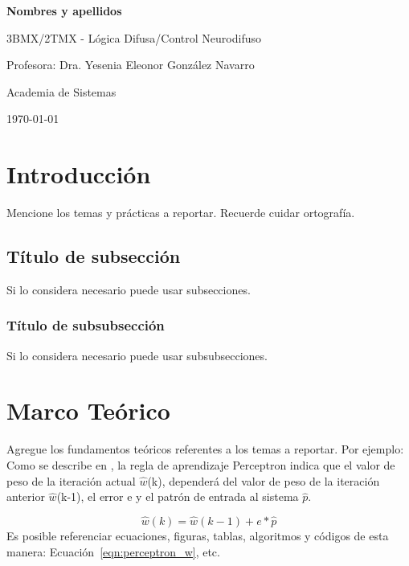 \documentclass{article}
\begin{document}
    \large{\textbf{Nombres y apellidos}} %
    \vspace{2mm}
    
    3BMX/2TMX - Lógica Difusa/Control Neurodifuso %
    \vspace{2mm} 
    
    Profesora: Dra. Yesenia Eleonor González Navarro %
    \vspace{1mm}
    
    Academia de Sistemas %
    \vspace{1mm} 
     
    \today


\tableofcontents 
\newpage

\section{Introducción} %
Mencione los temas y prácticas a reportar. Recuerde cuidar ortografía.

\subsection{Título de subsección} %
Si lo considera necesario puede usar subsecciones.

\subsubsection{Título de subsubsección} %
Si lo considera necesario puede usar subsubsecciones.


\section{Marco Teórico} %
Agregue los fundamentos teóricos referentes a los temas a reportar. Por ejemplo: Como se describe en \cite{Hagan_2014}, la regla de aprendizaje Perceptron indica que el valor de peso de la iteración actual $\hat{w}$(k), dependerá del valor de peso de la iteración anterior $\hat{w}$(k-1), el error e y el patrón de entrada al sistema $\hat{p}$. 

\begin{equation}
    \hat{w}(k) = \hat{w}(k-1) + e*\hat{p}
    \label{eqn:perceptron_w}
\end{equation}
Es posible referenciar ecuaciones, figuras, tablas, algoritmos y códigos de esta manera: Ecuación~\ref{eqn:perceptron_w}, etc.
\end{document}
